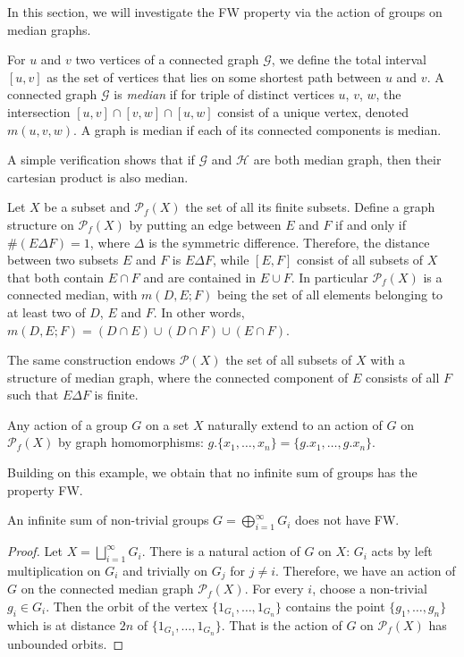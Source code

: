 In this section, we will investigate the FW property via the action of groups on median graphs.

For $u$ and $v$ two vertices of a connected graph $\mathcal G$, we define the total interval $[u,v]$ as the set of vertices that lies on some shortest path between $u$ and $v$.
A connected graph $\mathcal G$ is \emph{median} if for triple of distinct vertices $u$, $v$, $w$, the intersection $[u,v]\cap[v,w]\cap[u,w]$ consist of a unique vertex, denoted $m(u,v,w)$.
A graph is median if each of its connected components is median.

A simple verification shows that if $\mathcal G$ and $\mathcal H$ are both median graph, then their cartesian product is also median.

\begin{exmp}
Let $X$ be a subset and $\mathcal P_f(X)$ the set of all its finite subsets.
Define a graph structure on $\mathcal P_f(X)$ by putting an edge between $E$ and $F$ if and only if $\#(E\Delta F)=1$, where $\Delta$ is the symmetric difference.
Therefore, the distance between two subsets $E$ and $F$ is $E\Delta F$, while $[E,F]$ consist of all subsets of $X$ that both contain $E\cap F$ and are contained in $E\cup F$.
In particular $\mathcal P_f(X)$ is a connected median, with $m(D,E;F)$ being the set of all elements belonging to at least two of $D$, $E$ and $F$. In other words,
$m(D,E;F)=(D\cap E)\cup(D\cap F)\cup(E\cap F)$.

The same construction endows $\mathcal P(X)$ the set of all subsets of $X$ with a structure of median graph, where the connected component of $E$ consists of all $F$ such that $E\Delta F$ is finite.

Any action of a group $G$ on a set $X$ naturally extend to an action of $G$ on $\mathcal P_f(X)$ by graph homomorphisms: $g.\{x_1,\dots,x_n\}=\{g.x_1,\dots,g.x_n\}$.
\end{exmp}

Building on this example, we obtain that no infinite sum of groups has the property FW.
\begin{lem}\label{Lemma:Sum}
An infinite sum of non-trivial groups $G=\bigoplus_{i=1}^\infty G_i$ does not have FW.
\end{lem}
\begin{proof}
Let $X=\bigsqcup_{i=1}^\infty G_i$.
There is a natural action of $G$ on $X$: $G_i$ acts by left multiplication on $G_i$ and trivially on $G_j$ for $j\neq i$.
Therefore, we have an action of $G$ on the connected median graph $\mathcal P_f(X)$.
For every $i$, choose a non-trivial $g_i\in G_i$.
Then the orbit of the vertex $\{1_{G_1},\dots, 1_{G_n}\}$ contains the point $\{g_1,\dots, g_n\}$ which is at distance $2n$ of $\{1_{G_1},\dots, 1_{G_n}\}$.
That is the action of $G$ on $\mathcal P_f(X)$ has unbounded orbits.
\end{proof}

